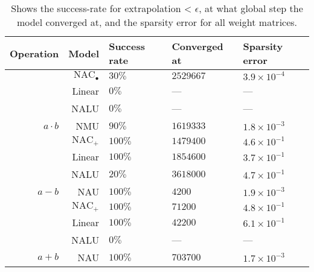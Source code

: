 \begin{table}[H]

\caption{\label{tab:function-task-static-defaults}Shows the success-rate for extrapolation < $\epsilon$, at what global step the model converged at, and the sparsity error for all weight matrices.}
\centering
\begin{tabular}{rrlll}
\toprule
Operation & Model & Success rate & Converged at & Sparsity error\\
\midrule
 & $\mathrm{NAC}_{\bullet}$ & $30\%$ & $2529667$ & $3.9 \times 10^{-4}$\\

 & Linear & $0\%$ & --- & ---\\

 & NALU & $0\%$ & --- & ---\\

\multirow{-4}{*}{\raggedleft\arraybackslash ${a \cdot b}$} & NMU & $90\%$ & $1619333$ & $1.8 \times 10^{-3}$\\
\cmidrule{1-5}
 & $\mathrm{NAC}_{+}$ & $100\%$ & $1479400$ & $4.6 \times 10^{-1}$\\

 & Linear & $100\%$ & $1854600$ & $3.7 \times 10^{-1}$\\

 & NALU & $20\%$ & $3618000$ & $4.7 \times 10^{-1}$\\

\multirow{-4}{*}{\raggedleft\arraybackslash $a - b$} & NAU & $100\%$ & $4200$ & $1.9 \times 10^{-3}$\\
\cmidrule{1-5}
 & $\mathrm{NAC}_{+}$ & $100\%$ & $71200$ & $4.8 \times 10^{-1}$\\

 & Linear & $100\%$ & $42200$ & $6.1 \times 10^{-1}$\\

 & NALU & $0\%$ & --- & ---\\

\multirow{-4}{*}{\raggedleft\arraybackslash $a + b$} & NAU & $100\%$ & $703700$ & $1.7 \times 10^{-3}$\\
\bottomrule
\end{tabular}
\end{table}
